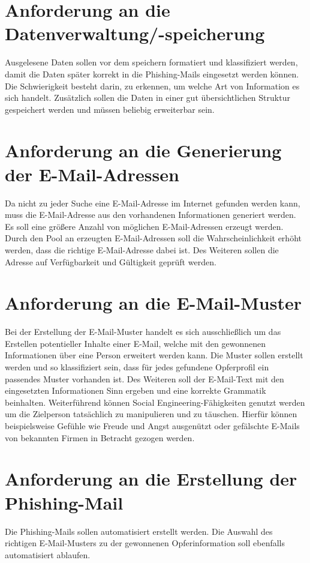 \section{Anforderung an die Datenverwaltung/-speicherung}
Ausgelesene Daten sollen vor dem speichern formatiert und klassifiziert werden, damit die Daten später korrekt in die Phishing-Mails eingesetzt werden können. Die Schwierigkeit besteht darin, zu erkennen, um welche Art von Information es sich handelt. Zusätzlich sollen die Daten in einer gut übersichtlichen Struktur gespeichert werden und müssen beliebig erweiterbar sein.
	
\section{Anforderung an die Generierung der E-Mail-Adressen}
Da nicht zu jeder Suche eine E-Mail-Adresse im Internet gefunden werden kann, muss die E-Mail-Adresse aus den vorhandenen Informationen generiert werden. Es soll eine größere Anzahl von möglichen E-Mail-Adressen erzeugt werden. Durch den Pool an erzeugten E-Mail-Adressen soll die Wahrscheinlichkeit erhöht werden, dass die richtige E-Mail-Adresse dabei ist. Des Weiteren sollen die Adresse auf Verfügbarkeit und Gültigkeit geprüft werden.
	
\section{Anforderung an die E-Mail-Muster}
Bei der Erstellung der E-Mail-Muster handelt es sich ausschließlich um das Erstellen potentieller Inhalte einer E-Mail, welche mit den gewonnenen Informationen über eine Person erweitert werden kann. Die Muster sollen erstellt werden und so klassifiziert sein, dass für jedes gefundene Opferprofil ein passendes Muster vorhanden ist. Des Weiteren soll der E-Mail-Text mit den eingesetzten Informationen Sinn ergeben und eine korrekte Grammatik beinhalten. Weiterführend können Social Engineering-Fähigkeiten genutzt werden um die Zielperson tatsächlich zu manipulieren und zu täuschen. Hierfür können beispielsweise Gefühle wie Freude und Angst ausgenützt oder gefälschte E-Mails von bekannten Firmen in Betracht gezogen werden.
	
\section{Anforderung an die Erstellung der Phishing-Mail}
Die Phishing-Mails sollen automatisiert erstellt werden. Die Auswahl des richtigen E-Mail-Musters zu der gewonnenen Opferinformation soll ebenfalls automatisiert ablaufen.

